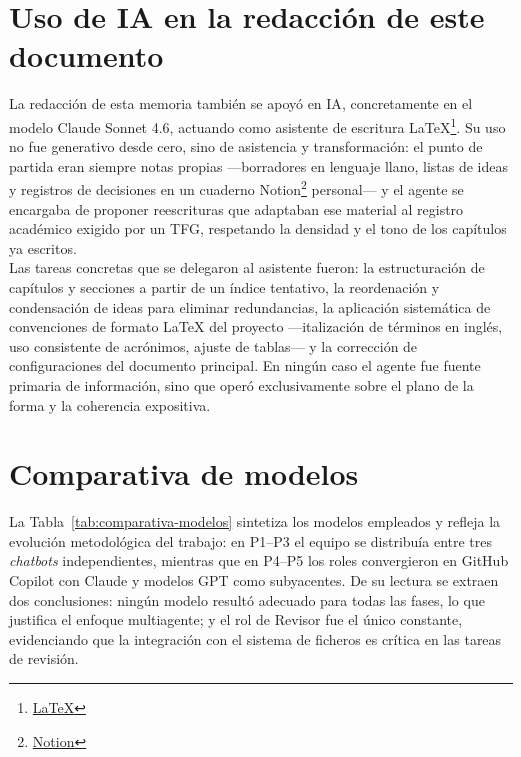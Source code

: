 \section{Uso de IA en la redacción de este documento} \label{sec:ia-memoria}

La redacción de esta memoria también se apoyó en \ac{IA}, concretamente en el modelo Claude Sonnet 4.6, actuando como asistente de escritura LaTeX\footnote{\href{https://es.wikipedia.org/wiki/LaTeX}{LaTeX}}.
Su uso no fue generativo desde cero, sino de asistencia y transformación: el punto de partida eran siempre notas propias ---borradores en lenguaje llano, listas de ideas y registros de decisiones en un cuaderno Notion\footnote{\href{https://www.notion.com/es-es}{Notion}} personal--- y el agente se encargaba de proponer reescrituras que adaptaban ese material al registro académico exigido por un \ac{TFG}, respetando la densidad y el tono de los capítulos ya escritos.\\

Las tareas concretas que se delegaron al asistente fueron: la estructuración de capítulos y secciones a partir de un índice tentativo, la reordenación y condensación de ideas para eliminar redundancias, la aplicación sistemática de convenciones de formato LaTeX del proyecto ---italización de términos en inglés, uso consistente de acrónimos, ajuste de tablas--- y la corrección de configuraciones del documento principal. En ningún caso el agente fue fuente primaria de información, sino que operó exclusivamente sobre el plano de la forma y la coherencia expositiva.

\section{Comparativa de modelos} \label{sec:comparativa-modelos}

La Tabla~\ref{tab:comparativa-modelos} sintetiza los modelos empleados y refleja la evolución metodológica del trabajo: en P1--P3 el equipo se distribuía entre tres \textit{chatbots} independientes, mientras que en P4--P5 los roles convergieron en GitHub Copilot con Claude y modelos GPT como subyacentes. De su lectura se extraen dos conclusiones: ningún modelo resultó adecuado para todas las fases, lo que justifica el enfoque multiagente; y el rol de Revisor fue el único constante, evidenciando que la integración con el sistema de ficheros es crítica en las tareas de revisión.

